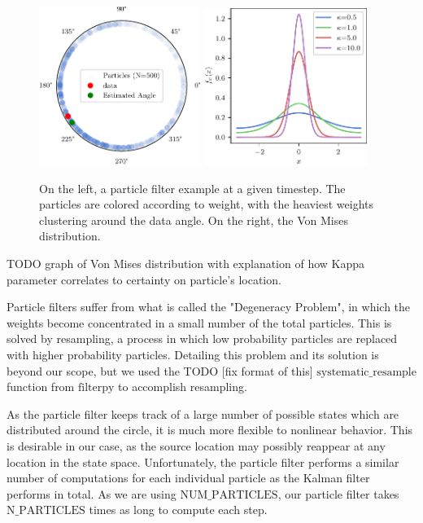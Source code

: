 \documentclass[11pt]{amsart}
\begin{document}
\begin{figure}[htp]
    \centering
    \includegraphics[width=0.47\textwidth]{actual_paper_graphs/particle_filter_example.pdf}\hfill
    \includegraphics[width=0.47\textwidth]{actual_paper_graphs/von_mises_pdf.pdf}\hfill
    \caption{On the left, a particle filter example at a given timestep. The particles are colored according to weight, with the heaviest weights clustering around the data angle. On the right, the Von Mises distribution.}
    \label{fig:particle_filter_stuff}
\end{figure}

TODO graph of Von Mises distribution with explanation of how Kappa parameter 
correlates to certainty on particle's location.

Particle filters suffer from what is called the "Degeneracy Problem", in which the weights become concentrated in a small number of the total particles. This is solved by resampling, a process in which low probability particles are replaced 
with higher probability particles. Detailing this problem and its solution is beyond our scope, but we used the TODO [fix format of this] $\text{systematic\_resample}$ function from $\text{filterpy}$ to accomplish resampling.

As the particle filter keeps track of a large number of possible states which are distributed around the circle, it is much more flexible to nonlinear behavior. This is desirable in our case, as the source location may possibly reappear at any 
location in the state space. Unfortunately, the particle filter performs a similar number of computations for each individual particle as the Kalman filter performs in total. As we are using $\text{NUM\_PARTICLES}$, our particle filter takes $\text{N\_PARTICLES}$ 
times as long to compute each step.
\end{document}
